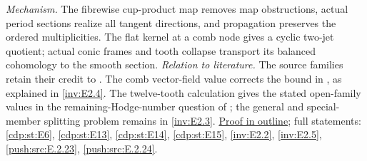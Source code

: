 \textit{Mechanism.} The fibrewise cup-product map removes map
obstructions, actual period sections realize all tangent
directions, and propagation preserves the ordered multiplicities.
The flat kernel at a comb node gives a cyclic two-jet quotient;
actual conic frames and tooth collapse transport its balanced
cohomology to the smooth section.
\textit{Relation to literature.} The source families retain their
credit to \cite{Viaclovsky2026Two,LiuRollenske2026,Viaclovsky2026Combs}.
The comb vector-field value corrects the bound in
\cite[Corollary~1.3, p.~2]{HKP2000}, as explained in
\ref{inv:E2.4}.
The twelve-tooth calculation gives the stated open-family values
in the remaining-Hodge-number question of
\cite[Section~10(2)]{Viaclovsky2026Combs}; the general and
special-member splitting problem remains in \ref{inv:E2.3}.
\hyperlink{outline-II-F}{Proof in outline}; full statements:
\ref{cdp:st:E6}, \ref{cdp:st:E13}, \ref{cdp:st:E14},
\ref{cdp:st:E15}, \ref{inv:E2.2}, \ref{inv:E2.5},
\ref{push:src:E.2.23}, \ref{push:src:E.2.24}.

\hypertarget{outline-II-F}{}
